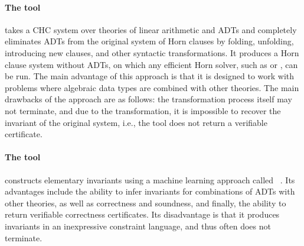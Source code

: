 \paragraph{The \vericat{} tool~\cite{10.1093/logcom/exab090,pettorossi_proietti_2022,10.1007/978-3-030-51074-9_6,angelis_fioravanti_pettorossi_proietti_2018}} takes a CHC system over theories of linear arithmetic and ADTs and completely eliminates ADTs from the original system of Horn clauses by folding, unfolding, introducing new clauses, and other syntactic transformations. It produces a Horn clause system without ADTs, on which any efficient Horn solver, such as \spacer{} or \eldarica{}, can be run. The main advantage of this approach is that it is designed to work with problems where algebraic data types are combined with other theories. The main drawbacks of the approach are as follows: the transformation process itself may not terminate, and due to the transformation, it is impossible to recover the invariant of the original system, i.\:e., the tool does not return a verifiable certificate.

\paragraph{The \hoice{} tool~\cite{10.1007/978-3-030-02768-1_8}} constructs elementary invariants using a machine learning approach called \ice{}~\cite{10.1007/978-3-319-08867-9_5}. Its advantages include the ability to infer invariants for combinations of ADTs with other theories, as well as correctness and soundness, and finally, the ability to return verifiable correctness certificates. Its disadvantage is that it produces invariants in an inexpressive constraint language, and thus often does not terminate.

